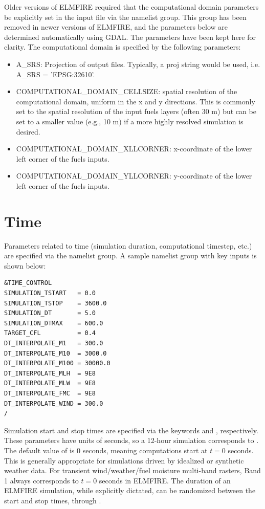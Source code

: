 Older versions of ELMFIRE required that the computational domain parameters be explicitly set in the input file via the  namelist group. This group has been removed in newer versions of ELMFIRE, and the parameters below are determined automatically using GDAL. The parameters have been kept here for clarity. The computational domain is specified by the following parameters:

\begin{itemize}
    \item A\_SRS: Projection of output files. Typically, a proj string would be used, i.e. A\_SRS = 'EPSG:32610'.
    \item COMPUTATIONAL\_DOMAIN\_CELLSIZE: spatial resolution of the computational domain, uniform in the x and y directions. This is commonly set to the spatial resolution of the input fuels layers (often 30 m) but can be set to a smaller value (e.g., 10 m) if a more highly resolved simulation is desired.
    \item COMPUTATIONAL\_DOMAIN\_XLLCORNER: x-coordinate of the lower left corner of the fuels inputs.
    \item COMPUTATIONAL\_DOMAIN\_YLLCORNER: y-coordinate of the lower left corner of the fuels inputs.
\end{itemize}

\section{Time}
\label{time}

Parameters related to time (simulation duration, computational timestep, etc.) are specified via the  namelist group. A sample  namelist group with key inputs is shown below:

\begin{verbatim}
&TIME_CONTROL
SIMULATION_TSTART   = 0.0
SIMULATION_TSTOP    = 3600.0
SIMULATION_DT       = 5.0
SIMULATION_DTMAX    = 600.0
TARGET_CFL          = 0.4
DT_INTERPOLATE_M1   = 300.0
DT_INTERPOLATE_M10  = 3000.0
DT_INTERPOLATE_M100 = 30000.0
DT_INTERPOLATE_MLH  = 9E8
DT_INTERPOLATE_MLW  = 9E8
DT_INTERPOLATE_FMC  = 9E8
DT_INTERPOLATE_WIND = 300.0
/
\end{verbatim}

Simulation start and stop times are specified via the keywords  and , respectively. These parameters have units of seconds, so a 12-hour simulation corresponds to . The default value of  is 0 seconds, meaning computations start at $t = 0$ seconds. This is generally appropriate for simulations driven by idealized or synthetic weather data. For transient wind/weather/fuel moisture multi-band rasters, Band 1 always corresponds to $t = 0$ seconds in ELMFIRE. The duration of an ELMFIRE simulation, while explicitly dictated, can be randomized between the start and stop times, through .

